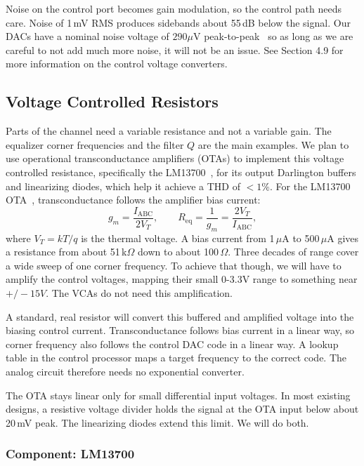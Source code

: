 \documentclass[11pt, letterpaper,titlepage]{article}
\begin{document}
Noise on the control port becomes gain modulation, so the control path needs
care. Noise of 1\,mV RMS produces sidebands about 55\,dB below the signal. Our DACs have a nominal noise voltage of $290\mu$V peak-to-peak~\cite{mcp4728} so as long as we are careful to not add much more noise, it will not be an issue. See Section 4.9 for more information on the control voltage converters.

\subsection{Voltage Controlled Resistors}

Parts of the channel need a variable resistance and not a variable gain. The
equalizer corner frequencies and the filter $Q$ are the main examples. We plan to use operational transconductance amplifiers (OTAs) to implement this voltage controlled resistance, specifically the LM13700~\cite{lm13700}, for its output Darlington buffers and linearizing diodes, which help it achieve a THD of $<1\%.$  For the
LM13700 OTA~\cite{lm13700}, transconductance follows the amplifier
bias current:
%
\begin{equation}
    g_m = \frac{I_\mathrm{ABC}}{2 V_T} ,
    \qquad
    R_\mathrm{eq} = \frac{1}{g_m} = \frac{2 V_T}{I_\mathrm{ABC}} ,
    \label{eq:ota-gm}
\end{equation}
%
where $V_T = kT/q$ is the thermal voltage. A bias current from 1\,$\mu$A to
500\,$\mu$A gives a resistance from about 51\,k$\Omega$ down to about
100\,$\Omega$. Three decades of range cover a wide sweep of one corner
frequency. To achieve that though, we will have to amplify the control voltages, mapping their small 0-3.3V range to something near $+/-15V$. The VCAs do not need this amplification.

A standard, real resistor will convert this buffered and amplified voltage into the biasing control current.
Transconductance follows bias current in a linear way, so corner frequency also
follows the control DAC code in a linear way. A lookup table in the control
processor maps a target frequency to the correct code. The analog circuit
therefore needs no exponential converter.

The OTA stays linear only for small differential input voltages. In most existing designs, a resistive voltage
divider holds the signal at the OTA input below about 20\,mV peak. The
linearizing diodes extend this limit. We will do both.



\subsubsection*{Component: LM13700}
\end{document}
